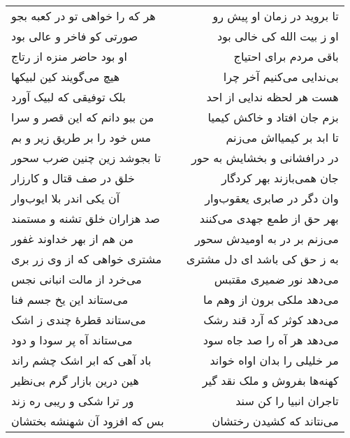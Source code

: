 \begin{center}
\begin{longtable}{l p{0.5cm} r}
هر که را خواهی تو در کعبه بجو
&&
تا بروید در زمان او پیش رو
\\
صورتی کو فاخر و عالی بود
&&
او ز بیت الله کی خالی بود
\\
او بود حاضر منزه از رتاج
&&
باقی مردم برای احتیاج
\\
هیچ می‌گویند کین لبیکها
&&
بی‌ندایی می‌کنیم آخر چرا
\\
بلک توفیقی که لبیک آورد
&&
هست هر لحظه ندایی از احد
\\
من ببو دانم که این قصر و سرا
&&
بزم جان افتاد و خاکش کیمیا
\\
مس خود را بر طریق زیر و بم
&&
تا ابد بر کیمیااش می‌زنم
\\
تا بجوشد زین چنین ضرب سحور
&&
در درافشانی و بخشایش به حور
\\
خلق در صف قتال و کارزار
&&
جان همی‌بازند بهر کردگار
\\
آن یکی اندر بلا ایوب‌وار
&&
وان دگر در صابری یعقوب‌وار
\\
صد هزاران خلق تشنه و مستمند
&&
بهر حق از طمع جهدی می‌کنند
\\
من هم از بهر خداوند غفور
&&
می‌زنم بر در به اومیدش سحور
\\
مشتری خواهی که از وی زر بری
&&
به ز حق کی باشد ای دل مشتری
\\
می‌خرد از مالت انبانی نجس
&&
می‌دهد نور ضمیری مقتبس
\\
می‌ستاند این یخ جسم فنا
&&
می‌دهد ملکی برون از وهم ما
\\
می‌ستاند قطرهٔ چندی ز اشک
&&
می‌دهد کوثر که آرد قند رشک
\\
می‌ستاند آه پر سودا و دود
&&
می‌دهد هر آه را صد جاه سود
\\
باد آهی که ابر اشک چشم راند
&&
مر خلیلی را بدان اواه خواند
\\
هین درین بازار گرم بی‌نظیر
&&
کهنه‌ها بفروش و ملک نقد گیر
\\
ور ترا شکی و ریبی ره زند
&&
تاجران انبیا را کن سند
\\
بس که افزود آن شهنشه بختشان
&&
می‌نتاند که کشیدن رختشان
\\
\end{longtable}
\end{center}
